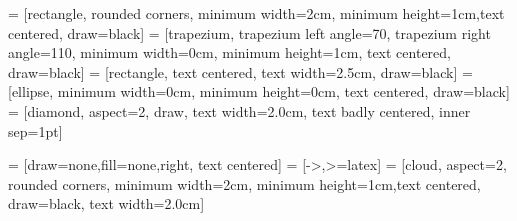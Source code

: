 \documentclass[main.tex]{subfiles}
\begin{document}
 = [rectangle, rounded corners, minimum width=2cm, minimum height=1cm,text centered, draw=black]
 = [trapezium, trapezium left angle=70, trapezium right angle=110, minimum width=0cm, minimum height=1cm, text centered, draw=black]
 = [rectangle, text centered, text width=2.5cm, draw=black]
 = [ellipse, minimum width=0cm, minimum height=0cm, text centered, draw=black]
 = [diamond, aspect=2, draw, text width=2.0cm, text badly centered, inner sep=1pt]

 = [draw=none,fill=none,right, text centered]
 = [->,>=latex]
 = [cloud, aspect=2, rounded corners, minimum width=2cm, minimum height=1cm,text centered, draw=black, text width=2.0cm]


\end{document}
